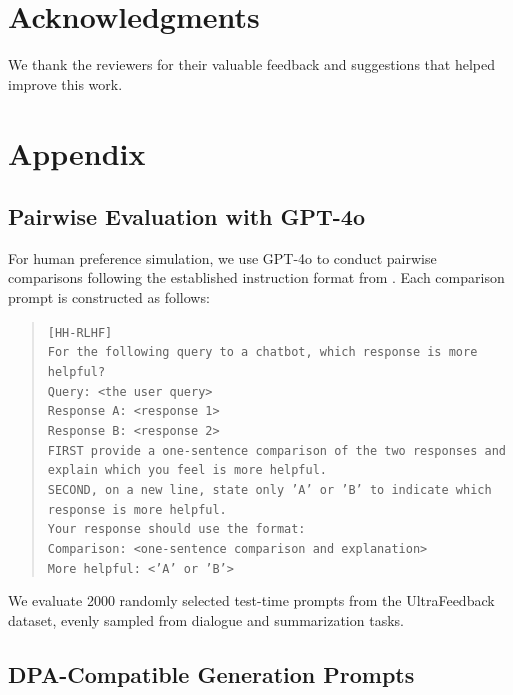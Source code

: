 \documentclass{article} %
\begin{document}
\section*{Acknowledgments}
We thank the reviewers for their valuable feedback and suggestions that helped improve this work.




\appendix
\section{Appendix}

\subsection{Pairwise Evaluation with GPT-4o}

For human preference simulation, we use GPT-4o to conduct pairwise comparisons following the established instruction format from \cite{rafailov2024direct}. Each comparison prompt is constructed as follows:

\begin{quote}
\texttt{[HH-RLHF]}\\
\texttt{For the following query to a chatbot, which response is more helpful?}\\
\texttt{Query: <the user query>}\\
\texttt{Response A: <response 1>}\\
\texttt{Response B: <response 2>}\\
\texttt{FIRST provide a one-sentence comparison of the two responses and explain which you feel is more helpful.}\\
\texttt{SECOND, on a new line, state only 'A' or 'B' to indicate which response is more helpful.}\\
\texttt{Your response should use the format:}\\
\texttt{Comparison: <one-sentence comparison and explanation>}\\
\texttt{More helpful: <'A' or 'B'>}
\end{quote}

We evaluate 2000 randomly selected test-time prompts from the UltraFeedback dataset, evenly sampled from dialogue and summarization tasks.

\subsection{DPA-Compatible Generation Prompts}
\end{document}
